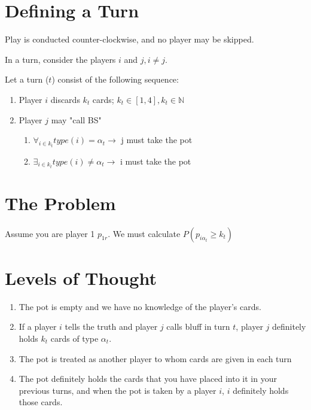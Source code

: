 \documentclass[letterpaper,11pt]{report}
\begin{document}
\begin{description}
    \section{Defining a Turn}
    \item Play is conducted counter-clockwise, and no player may be skipped.
    \item In a turn, consider the players $i$ and $j, i \neq j$.
    \item Let a turn ($t$) consist of the following sequence:
    \begin{enumerate}
        \item Player $i$ discards $k_t$ cards; $k_t \in [1,4], k_t \in \mathbb{N}$
        \item Player $j$ may "call BS"
        \begin{enumerate}
            \item $\forall_{i\in k_t} type(i) = \alpha_t \rightarrow$ j must take the pot
            \item $\exists_{i\in k_t} type(i) \neq \alpha_t \rightarrow$ i must take the pot
        \end{enumerate}
    \end{enumerate}
    \section{The Problem}
    \paragraph{} Assume you are player 1 $p_{1 r}$. We must calculate $P(p_{i \alpha_t} \geq k_t)$
    \section{Levels of Thought}
    \begin{enumerate}
        \item The pot is empty and we have no knowledge of the player's cards.
        \item If a player $i$ tells the truth and player $j$ calls bluff in turn $t$, player $j$ definitely holds $k_t$ cards of type $\alpha_t$.
        \item The pot is treated as another player to whom cards are given in each turn
        \item The pot definitely holds the cards that you have placed into it in your previous turns, and when the pot is taken by a player $i$, $i$ definitely holds those cards.
    \end{enumerate}
\end{description}
\end{document}
